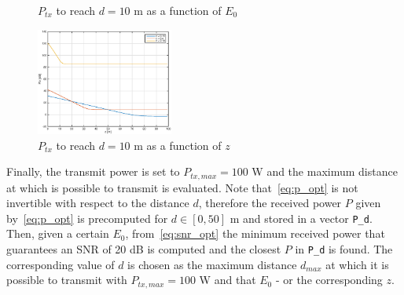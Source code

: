 \documentclass[10pt]{article}
\begin{document}
\begin{figure}[h!]
	\centering
	\caption{$P_{tx}$ to reach $d = 10$ m as a function of $E_0$}
	\label{fig:ptx}
\end{figure}

\begin{figure}[h!]
	\centering
	\includegraphics[width= 0.4\textwidth]{ptx_z}
	\caption{$P_{tx}$ to reach $d = 10$ m as a function of $z$}
	\label{fig:ptx_2}
\end{figure}

Finally, the transmit power is set to $P_{tx, max} = 100$ W and the maximum distance at which is possible to transmit is evaluated. Note that~\eqref{eq:p_opt} is not invertible with respect to the distance $d$, therefore the received power $P$ given by~\eqref{eq:p_opt} is precomputed for $d \in [0, 50]$ m and stored in a vector \texttt{P\_d}. Then, given a certain $E_0$, from~\eqref{eq:snr_opt} the minimum received power that guarantees an SNR of 20 dB is computed and the closest $P$ in \texttt{P\_d} is found. The corresponding value of $d$ is chosen as the maximum distance $d_{max}$ at which it is possible to transmit with $P_{tx, max} = 100$ W and that $E_0$ - or the corresponding $z$.
\end{document}
